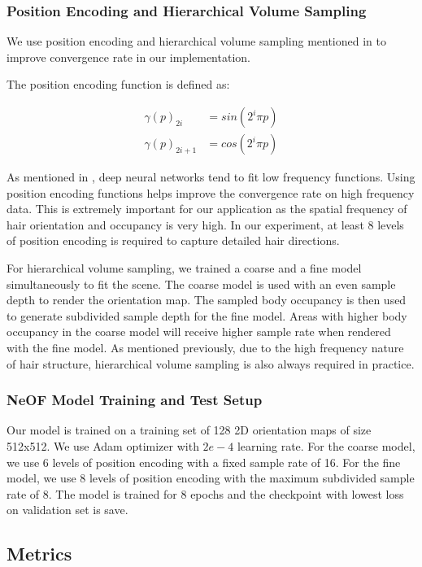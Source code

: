 \documentclass{article}
\begin{document}
\subsubsection{Position Encoding and Hierarchical Volume Sampling}

We use position encoding and hierarchical volume sampling mentioned in \cite{mildenhall_nerf_2020} to improve convergence rate in our implementation.

The position encoding function is defined as:

\begin{align}
    \gamma(p)_{2i} &= sin(2^{i} \pi p) \\
    \gamma(p)_{2i + 1} &= cos(2^{i} \pi p)
\end{align}

As mentioned in \cite{mildenhall_nerf_2020}, deep neural networks tend to fit low frequency functions. Using position encoding functions helps improve the convergence rate on high frequency data. This is extremely important for our application as the spatial frequency of hair orientation and occupancy is very high. In our experiment, at least 8 levels of position encoding is required to capture detailed hair directions.

For hierarchical volume sampling, we trained a coarse and a fine model simultaneously to fit the scene. The coarse model is used with an even sample depth to render the orientation map. The sampled body occupancy is then used to generate subdivided sample depth for the fine model. Areas with higher body occupancy in the coarse model will receive higher sample rate when rendered with the fine model. As mentioned previously, due to the high frequency nature of hair structure, hierarchical volume sampling is also always required in practice.

\subsubsection{NeOF Model Training and Test Setup}

Our model is trained on a training set of 128 2D orientation maps of size 512x512. We use Adam optimizer with $2e-4$ learning rate. For the coarse model, we use 6 levels of position encoding with a fixed sample rate of 16. For the fine model, we use 8 levels of position encoding with the maximum subdivided sample rate of 8. The model is trained for 8 epochs and the checkpoint with lowest loss on validation set is save.

\subsection{Metrics}
\end{document}
